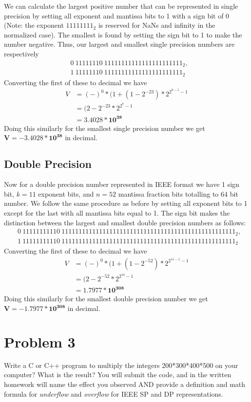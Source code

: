 \documentclass[12pt,letter]{article}
\begin{document}
We can calculate the largest positive number that can be represented in single precision by setting all exponent and mantissa bits to 1 with a sign bit of 0 (Note: the exponent $11111111_2$ is reserved for NaNs and infinity in the normalized case). The smallest is found by setting the sign bit to 1 to make the number negative. Thus, our largest and smallest single precision numbers are respectively
\begin{align*}
    & 0\:11111110\:11111111111111111111111_2, \\
    & 1\:11111110\:11111111111111111111111_2
\end{align*}
Converting the first of these to decimal we have 
\begin{align*} 
    V &= (-)^0 * (1+(1-2^{-23})* 2^{2^{8-1} - 1} \\
    &= (2-2^{-23} * 2^{2^7 - 1} \\
    &= \mathbf{3.4028*10^{38}}
\end{align*}
Doing this similarly for the smallest single precision number we get $\mathbf{V = −3.4028*10^{38}}$ in decimal.

\subsection{Double Precision}
Now for a double precision number represented in IEEE format we have 1 sign bit, $k=11$ exponent bits, and $n=52$ mantissa fraction bits totalling to 64 bit number. We follow the same procedure as before by setting all exponent bits to 1 except for the last with all mantissa bits equal to 1. The sign bit makes the distinction between the largest and smallest double precision numbers as follows:
\begin{align*}
    & 0\:11111111110\:111111111111111111111111111111111111111111111111111_2, \\
    & 1\:11111111110\:111111111111111111111111111111111111111111111111111_2
\end{align*}
Converting the first of these to decimal we have 
\begin{align*} 
    V &= (-)^0 * (1+(1-2^{-52})* 2^{2^{11-1} - 1} \\
    &= (2-2^{-52} * 2^{2^10 - 1} \\
    &= \mathbf{1.7977*10^{308}}
\end{align*}
Doing this similarly for the smallest double precision number we get $\mathbf{V = −1.7977*10^{308}}$ in decimal.


\section{Problem 3}
\begin{mdframed}
Write a C or C++ program to multiply the integers 200*300*400*500 on your computer? What is the
result? You will submit the code, and in the written homework will name the effect you observed AND
provide a definition and math formula for \textit{underflow} and \textit{overflow} for IEEE SP and DP representations.
\end{mdframed}
\end{document}
